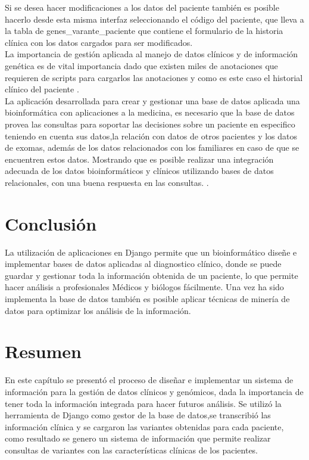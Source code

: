 Si se desea hacer modificaciones a los datos del paciente también es posible hacerlo desde esta misma interfaz seleccionando el código del paciente, que lleva a la tabla de genes\_varante\_paciente que contiene el formulario de la historia clínica con los datos cargados para ser modificados. \\

La importancia de gestión aplicada al manejo de datos clínicos y de información genética es de vital importancia dado que existen miles de anotaciones que requieren de scripts para cargarlos las anotaciones y como es este caso el historial clínico del paciente \cite{Paila2013}. \\

La aplicación desarrollada para crear y gestionar una base de datos aplicada una bioinformática con aplicaciones a la medicina, es necesario que la base de datos provea las consultas para soportar las decisiones sobre un paciente en especifico teniendo en cuenta sus datos,la relación con datos de otros pacientes y los datos de exomas, además de los datos relacionados con los familiares en caso de que se encuentren estos datos. Mostrando que es posible realizar una integración adecuada de los datos bioinformáticos y clínicos utilizando bases de datos relacionales, con una buena respuesta en las consultas. \cite{Sujansky2001}.

\section{Conclusión}

La utilización de aplicaciones en Django permite que un bioinformático diseñe e implementar bases de datos aplicadas al diagnostico clínico, donde se puede guardar y gestionar toda la información obtenida de un paciente, lo que permite hacer análisis a profesionales Médicos y biólogos fácilmente. Una vez ha sido implementa la base de datos también es posible aplicar técnicas de minería de datos para optimizar los análisis de la información. \\

\section*{Resumen}

En este capítulo se presentó el proceso de diseñar e implementar un sistema de información para la gestión de datos clínicos y genómicos, dada la importancia de tener toda la información integrada para hacer futuros análisis. Se utilizó la herramienta de Django como gestor de la base de datos,se transcribió las información clínica y se cargaron las variantes obtenidas para cada paciente, como resultado se genero un sistema de información que permite realizar consultas de variantes con las características clínicas de los pacientes.   